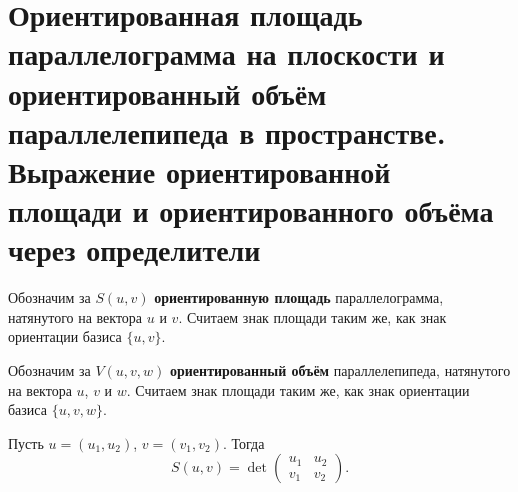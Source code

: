 \section{Ориентированная площадь параллелограмма на плоскости и ориентированный объём параллелепипеда в пространстве. Выражение ориентированной площади и ориентированного объёма через определители}

\begin{definition}
    Обозначим за $S(u, v)$ \textbf{ориентированную площадь} параллелограмма, натянутого на вектора $u$ и $v$. Считаем знак площади таким же, как знак ориентации базиса $\{u, v\}$\footnotemark.
\end{definition}

\begin{definition}
    Обозначим за $V(u, v, w)$ \textbf{ориентированный объём} параллелепипеда, натянутого на вектора $u$, $v$ и $w$. Считаем знак площади таким же, как знак ориентации базиса $\{u,v , w\}$.
\end{definition}


\begin{statement}
    Пусть $u = (u_1, u_2)$, $v = (v_1, v_2)$. Тогда
    $$S(u, v) = \det
    \begin{pmatrix}
        u_1 & u_2\\
        v_1 & v_2
    \end{pmatrix}.$$
\end{statement}

